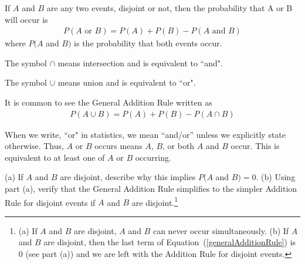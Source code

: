 \begin{termBox}{ If $A$ and $B$ are any two events, disjoint or not, then the probability that A or B will occur is
\begin{eqnarray}
P(A\text{ or }B) = P(A) + P(B) - P(A\text{ and }B)
\label{generalAdditionRule}
\end{eqnarray}
where $P(A$ and $B)$ is the probability that both events occur.}
\end{termBox}


\begin{tipBox}{
The symbol $\cap$ means intersection and is equivalent to ``and".

The symbol  $\cup$ means union and is equivalent to ``or".

It is common to see the General Addition Rule written as
\begin{eqnarray}
P(A \cup B) = P(A) + P(B) - P(A \cap B)
\end{eqnarray}
}
\end{tipBox}

\begin{tipBox}{
When we write, ``or"  in statistics, we mean ``and/or'' unless we explicitly state otherwise. Thus, $A$ or $B$ occurs means $A$, $B$, or both $A$ and $B$ occur. This is equivalent to at least one of $A$ or $B$ occurring.}
\end{tipBox}

\begin{exercise}
(a) If $A$ and $B$ are disjoint, describe why this implies $P(A$ and $B) = 0$. (b) Using part (a), verify that the General Addition Rule simplifies to the simpler Addition Rule for disjoint events if $A$ and $B$ are disjoint.\footnote{(a) If $A$ and $B$ are disjoint, $A$ and $B$ can never occur simultaneously. (b) If $A$ and $B$ are disjoint, then the last term of Equation~(\ref{generalAdditionRule}) is 0 (see part (a)) and we are left with the Addition Rule for disjoint events.}
\end{exercise}


